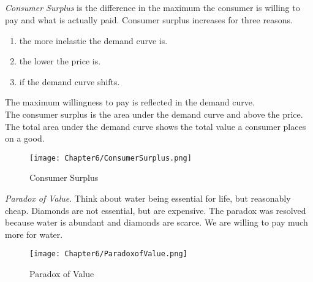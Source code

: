 \subsection{}
\begin{definition}
    \emph{Consumer Surplus} is the difference in the maximum the consumer is willing to pay 
    and what is actually paid. Consumer surplus increases for three reasons.
    \begin{enumerate}
        \item the more inelastic the demand curve is.
        \item the lower the price is.
        \item if the demand curve shifts.
    \end{enumerate}
\end{definition}
The maximum willingness to pay is reflected in the demand curve.\\
The consumer surplus is the area under the demand curve and above the price.\\
The total area under the demand curve shows the total value a consumer places on a good.
\begin{figure}[H]
    \centering
    \texttt{[image: Chapter6/ConsumerSurplus.png]}
    \caption{Consumer Surplus}
    \label{fig:Consumer_Surplus}
\end{figure}
\begin{definition}
    \emph{Paradox of Value}. Think about water being essential for life, but reasonably cheap. Diamonds are not essential, but are expensive.
    The paradox was resolved because water is abundant and diamonds are scarce. We are willing to pay much more for water.
\end{definition}
\begin{figure}[H]
    \centering
    \texttt{[image: Chapter6/ParadoxofValue.png]}
    \caption{Paradox of Value}
    \label{fig:Paradox_of_Value}
\end{figure}